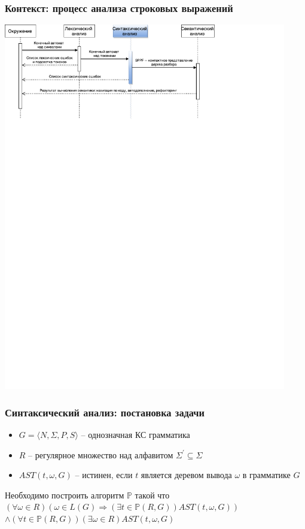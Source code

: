 \documentclass{beamer}
\begin{document}
\begin{frame}
    \transwipe[direction=90]
    \frametitle{Контекст: процесс анализа строковых выражений}
    \begin{center}
        \includegraphics[width=350pt]{pictures/Seq.pdf}
    \end{center}
\end{frame}

\begin{frame}
    \transwipe[direction=90]
    \frametitle{Синтаксический анализ: постановка задачи}
    \begin{itemize}    
        \item $G=\langle N,\Sigma, P,S\rangle$ -- однозначная КС грамматика
        \item $R$ -- регулярное множество над алфавитом ${\Sigma}^{'} \subseteq \Sigma $
        \item $AST(t,\omega,G)$ -- истинен, если $t$ является деревом вывода $\omega$ в грамматике $G$
    \end{itemize}
    \begin{block}{}
    Необходимо построить алгоритм $\mathbb{P}$ такой что
    $(\forall \omega \in R) (\omega \in L(G) \Rightarrow (\exists t \in \mathbb{P}(R,G))AST(t, \omega, G))$
    $\land (\forall t \in \mathbb{P}(R,G))(\exists \omega \in R)AST(t,\omega,G)$
    \end{block}
\end{frame}
\end{document}
